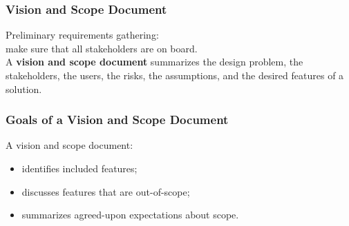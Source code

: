 \begin{frame}
\frametitle{Vision and Scope Document}

\begin{changemargin}{1cm}

Preliminary requirements gathering: \\
make sure that all stakeholders
are on board. \\[1em]

A {\bf vision and scope document} summarizes the design problem, the
stakeholders, the users, the risks, the assumptions, and the desired
features of a solution. 
\end{changemargin}

\end{frame}

\begin{frame}

\frametitle{Goals of a Vision and Scope Document}

\large
\begin{changemargin}{1cm}
A vision and scope document:
\begin{itemize}
\item identifies \alert{included} features;
\item discusses features that are \alert{out-of-scope};
\item \alert{summarizes} agreed-upon expectations about scope.
\end{itemize}
\end{changemargin}

\end{frame}

